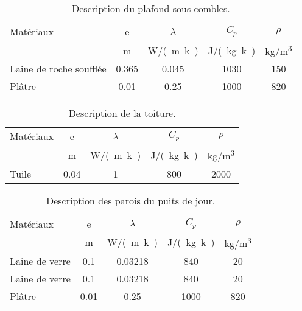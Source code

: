 \begin{table}
    \begin{tabular}{l *4{c}}
        \toprule
        Matériaux               & e         & $\lambda$      & $C_{p}$         & $\rho$          \\
                                & \si{m}  & \si{W/(m.k)}   & \si{J/(kg.k)}    &\si{kg/m^{3}}  \\
        \midrule
        Laine de roche soufflée & 0.365     & 0.045        & 1030               & 150                 \\
        Plâtre                  & 0.01      & 0.25         & 1000               & 820                 \\
        \bottomrule
    \end{tabular}
    \caption{Description du plafond sous combles.}
    \label{tab:compo_plafond}
\end{table}

\begin{table}
    \begin{tabular}{l *4{c}}
        \toprule
        Matériaux & e         & $\lambda$      & $C_{p}$         & $\rho$          \\
                  & \si{m}  & \si{W/(m.k)} & \si{J/(kg.k)} &\si{kg/m^{3}}  \\
        \midrule
        Tuile     & 0.04      & 1              & 800             & 2000            \\
        \bottomrule
    \end{tabular}
    \caption{Description de la toiture.}
    \label{tab:compo_toiture}
\end{table}

\begin{table}
    \begin{tabular}{l *4{c}}
        \toprule
        Matériaux         & e         & $\lambda$      & $C_{p}$         & $\rho$          \\
                          & \si{m}  & \si{W/(m.k)} & \si{J/(kg.k)} &\si{kg/m^{3}}  \\
        \midrule
        Laine de verre    & 0.1       & 0.03218        & 840             & 20              \\
        Laine de verre    & 0.1       & 0.03218        & 840             & 20              \\
        Plâtre            & 0.01      & 0.25           & 1000            & 820             \\
        \bottomrule
    \end{tabular}
    \caption{Description des parois du puits de jour.}
    \label{tab:compo_puits}
\end{table}

